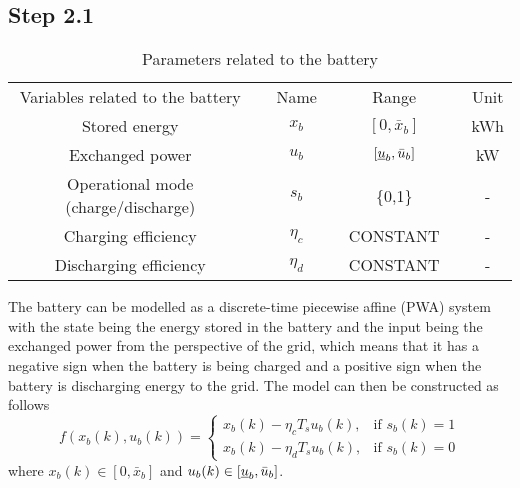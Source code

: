 \subsection*{Step 2.1}
\begin{table}[]
\centering
\begin{tabular}{clclclc}
Variables related to the battery &  & Name &  & Range &  & Unit \\ \cline{1-1} \cline{3-3} \cline{5-5} \cline{7-7} 
Stored energy &  & $x_b$ &  & $[0,\bar{x}_b]$ &  & kWh \\
Exchanged power &  & $u_b$ &  & $[\underbar{$u$}_b,\bar{u}_b]$ &  & kW \\
Operational mode (charge/discharge) &  & $s_b$ &  & \{0,1\} &  & - \\
Charging efficiency &  & $\eta_c$ &  & CONSTANT &  & - \\
Discharging efficiency &  & $\eta_d$ &  & CONSTANT &  & -
\end{tabular}
\caption{Parameters related to the battery}
\label{batteryParm}
\end{table}
The battery can be modelled as a discrete-time piecewise affine (PWA) system with the state being the energy stored in the battery and the input being the exchanged power from the perspective of the grid, which means that it has a negative sign when the battery is being charged and a positive sign when the battery is discharging energy to the grid. The model can then be constructed as follows
\begin{equation*}
f(x_b(k),u_b(k)) =\left\{\begin{matrix}
x_b(k)-\eta_c T_s u_b(k), & \text{if } s_b(k) = 1 \\
x_b(k)-\eta_d T_s u_b(k), & \text{if } s_b(k) = 0 
\end{matrix}\right.
\end{equation*}
where $x_b(k) \in [0,\bar{x}_b]$ and $u_b(k) \in [\underbar{$u$}_b, \bar{u}_b]$.
